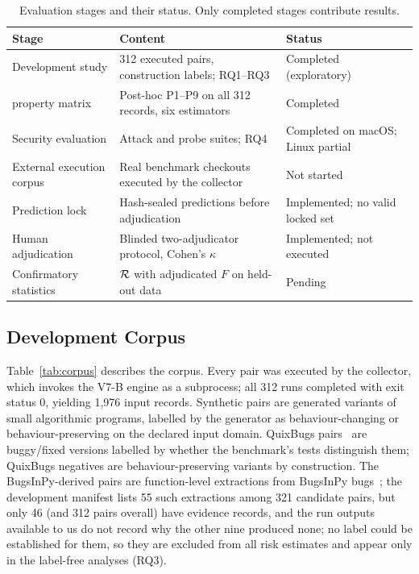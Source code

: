 \begin{table}[!t]
\caption{Evaluation stages and their status. Only completed stages contribute results.}
\label{tab:stages}
\centering
\scriptsize
\setlength{\tabcolsep}{3pt}
\begin{tabular}{|L{2.5cm}|L{3.1cm}|L{1.6cm}|}
\hline
Stage & Content & Status \\
\hline
Development study & 312 executed pairs, construction labels; RQ1--RQ3 & Completed (exploratory) \\
\ers{} property matrix & Post-hoc P1--P9 on all 312 records, six estimators & Completed \\
Security evaluation & Attack and probe suites; RQ4 & Completed on macOS; Linux partial \\
External execution corpus & Real benchmark checkouts executed by the collector & Not started \\
Prediction lock & Hash-sealed predictions before adjudication & Implemented; no valid locked set \\
Human adjudication & Blinded two-adjudicator protocol, Cohen's $\kappa$ & Implemented; not executed \\
Confirmatory statistics & $\mathcal{R}$ with adjudicated $F$ on held-out data & Pending \\
\hline
\end{tabular}
\end{table}

\subsection{Development Corpus}
Table~\ref{tab:corpus} describes the corpus. Every pair was executed by the \sbg{} collector, which invokes the V7-B engine as a subprocess; all 312 runs completed with exit status 0, yielding 1{,}976 input records. Synthetic pairs are generated variants of small algorithmic programs, labelled by the generator as behaviour-changing or behaviour-preserving on the declared input domain. QuixBugs pairs~\cite{lin2017quixbugs} are buggy/fixed versions labelled by whether the benchmark's tests distinguish them; QuixBugs negatives are behaviour-preserving variants by construction. The BugsInPy-derived pairs are function-level extractions from BugsInPy bugs~\cite{widyasari2020bugsinpy}; the development manifest lists 55 such extractions among 321 candidate pairs, but only 46 (and 312 pairs overall) have evidence records, and the run outputs available to us do not record why the other nine produced none; no label could be established for them, so they are excluded from all risk estimates and appear only in the label-free analyses (RQ3).

